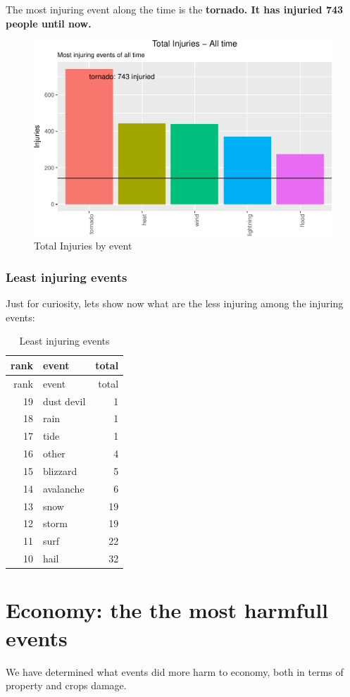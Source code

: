 \documentclass[]{article}
\begin{document}
The most injuring event along the time is the \textbf{tornado. It has
injuried 743 people until now.}

\begin{figure}[htbp]
\centering
\includegraphics{readme_files/figure-latex/injuring-all-plot-1.pdf}
\caption{Total Injuries by event}
\end{figure}

\subsubsection{Least injuring events}\label{least-injuring-events}

Just for curiosity, lets show now what are the less injuring among the
injuring events:

\begin{longtable}[]{@{}rlr@{}}
\caption{Least injuring events}\tabularnewline
\toprule
rank & event & total\tabularnewline
\midrule
\endfirsthead
\toprule
rank & event & total\tabularnewline
\midrule
\endhead
19 & dust devil & 1\tabularnewline
18 & rain & 1\tabularnewline
17 & tide & 1\tabularnewline
16 & other & 4\tabularnewline
15 & blizzard & 5\tabularnewline
14 & avalanche & 6\tabularnewline
13 & snow & 19\tabularnewline
12 & storm & 19\tabularnewline
11 & surf & 22\tabularnewline
10 & hail & 32\tabularnewline
\bottomrule
\end{longtable}

\section{Economy: the the most harmfull
events}\label{economy-the-the-most-harmfull-events}

We have determined what events did more harm to economy, both in terms
of property and crops damage.
\end{document}
